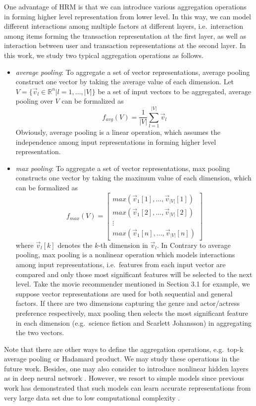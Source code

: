 \documentclass[10pt,journal,compsoc]{IEEEtran}
\begin{document}
One advantage of HRM is that we can introduce various aggregation operations in forming higher level representation from lower level. In this way, we can model different interactions among multiple factors at different layers, i.e.~interaction among items forming the transaction representation at the first layer, as well as interaction between user and transaction representations at the second layer. In this work, we study two typical aggregation operations as follows.
 \begin{itemize}
 \item \textit{average pooling}: To aggregate a set of vector representations, average pooling construct one vector by taking the average value of each dimension. Let $V=\{\vec{v}_l\in \mathbb{R}^n|l=1,\ldots,|V|\}$ be a set of input vectors to be aggregated, average pooling over $V$ can be formalized as
      \begin{displaymath}
        f_{avg}(V)=\frac{1}{|V|}\sum_{l=1}^{|V|} \vec{v}_l
     \end{displaymath}
     Obviously, average pooling is a linear operation, which assumes the independence among input representations in forming higher level representation.
 \item \textit{max pooling}: To aggregate a set of vector representations, max pooling constructs one vector by taking the maximum value of each dimension, which can be formalized as
     \begin{displaymath}
        f_{max}(V) = \left[ \begin{smallmatrix} max(\vec{v}_1[1],\ldots,\vec{v}_{|V|}[1])\\ max(\vec{v}_1[2],\ldots,\vec{v}_{|V|}[2])\\\vdots\\max(\vec{v}_1[n],\ldots,\vec{v}_{|V|}[n]) \end{smallmatrix} \right]
        \end{displaymath}
        where $\vec{v}_l[k]$ denotes the $k$-th dimension in $\vec{v}_l$.
        In Contrary to average pooling, max pooling is a nonlinear operation which models interactions among input representations, %
        i.e.~features from each input vector are compared and only those most significant features will be selected to the next level.
        Take the movie recommender mentioned in Section 3.1 for example, we suppose vector representations are used for both sequential and general factors. If there are two dimensions capturing the genre and actor/actress preference respectively, max pooling then selects the most significant feature in each dimension (e.g.~science fiction and Scarlett Johansson) in aggregating the two vectors.
 \end{itemize}
Note that there are other ways to define the aggregation operations, e.g.~top-k average pooling or Hadamard product. We may study these operations in the future work. Besides, one may also consider to introduce nonlinear hidden layers as in deep neural network \cite{Arisoy2012}. However, we resort to simple models since previous work has demonstrated that such models can learn accurate representations from very large data set due to low computational complexity \cite{efficent,mikolov2013}.
\end{document}
